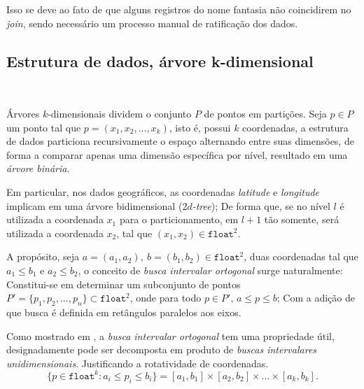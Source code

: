 \documentclass{article}
\begin{document}
\begin{adjustwidth}{-1.5cm}{-1.5cm}
Isso se deve ao fato de que alguns registros do nome fantasia não coincidirem no \textit{join}, sendo necessário um processo manual de ratificação dos dados.


\subsection{Estrutura de dados, árvore k-dimensional}
\ 

Árvores \(k\)-dimensionais dividem o conjunto \(P\) de pontos em partições. Seja \(p \in P\) um ponto tal que \(p=(x_1,x_2,...,x_k)\), isto é, possui \(k\) coordenadas, a estrutura de dados particiona recursivamente o espaço alternando entre suas dimensões, de forma a comparar apenas uma dimensão específica por nível, resultado em uma \textit{árvore binária}.

Em particular, nos dados geográficos, as coordenadas \textit{latitude} e \textit{longitude} implicam em uma árvore bidimensional (\(2d\)\textit{-tree}); De forma que, se no nível \(l\) é utilizada a coordenada \(x_1\) para o particionamento, em \(l+1\) tão somente, será utilizada a coordenada \(x_2\), tal que \((x_1,x_2) \in \texttt{float}^2\).

A propósito, seja \(a=(a_1,a_2),\ b=(b_1,b_2) \in \texttt{float}^2\), duas coordenadas tal que \(a_1\leq b_1\) e \(a_2 \leq b_2\), o conceito de \textit{busca intervalar ortogonal} surge naturalmente: Constitui-se em determinar um subconjunto de pontos \(P'=\{p_1,p_2,...,p_n\} \subset \texttt{float}^2\), onde 
para todo \(p \in P'\), \(a \leq p \leq b\); Com a adição de que busca é definida em retângulos paralelos aos eixos.

Como mostrado em \cite{md}, a \textit{busca intervalar ortogonal} tem uma propriedade útil, designadamente pode ser decomposta em produto de \textit{buscas intervalares unidimensionais}. Justificando a rotatividade de coordenadas.
\[\{p \in \texttt{float}^k : a_i \leq p_i \leq b_i\} = [a_1,b_1] \times[a_2,b_2] \times ... \times [a_k, b_k].\]

\begin{figure}[h!]
\centering
{}
\end{figure}
\end{adjustwidth}
\end{document}
